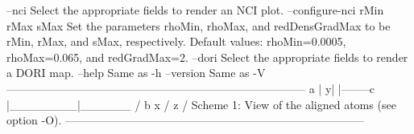   --nci      		Select the appropriate fields to render an NCI plot.
  --configure-nci rMin rMax sMax 	Set the parameters rhoMin, rhoMax,
             		  and redDensGradMax to be rMin, rMax, and sMax,
             		  respectively. Default values: rhoMin=0.0005,
             		  rhoMax=0.065, and redGradMax=2.
  --dori     		Select the appropriate fields to render a DORI map.
  --help    		Same as -h
  --version 		Same as -V
--------------------------------------------------------------------------------
            	           a
            	           |
            	          y|
            	           |--------c
            	           |________|______
            	           / b      x       
            	          /
            	       z / 
  Scheme 1: View of the aligned atoms (see option -O).
--------------------------------------------------------------------------------
